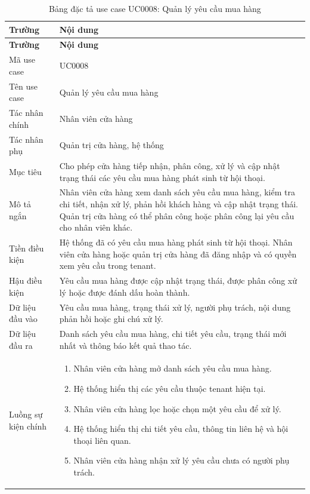 \documentclass[../DoAn.tex]{subfiles}
\begin{document}
\begin{longtable}{|p{}|p{}|}
\caption{Bảng đặc tả use case UC0008: Quản lý yêu cầu mua hàng}
\label{table:UC0008} \\
\hline
\textbf{Trường} & \textbf{Nội dung} \\
\hline
\endfirsthead

\hline
\textbf{Trường} & \textbf{Nội dung} \\
\hline
\endhead

Mã use case & UC0008 \\
\hline
Tên use case & Quản lý yêu cầu mua hàng \\
\hline
Tác nhân chính & Nhân viên cửa hàng \\
\hline
Tác nhân phụ & Quản trị cửa hàng, hệ thống \\
\hline
Mục tiêu & Cho phép cửa hàng tiếp nhận, phân công, xử lý và cập nhật trạng thái các yêu cầu mua hàng phát sinh từ hội thoại. \\
\hline
Mô tả ngắn & Nhân viên cửa hàng xem danh sách yêu cầu mua hàng, kiểm tra chi tiết, nhận xử lý, phản hồi khách hàng và cập nhật trạng thái. Quản trị cửa hàng có thể phân công hoặc phân công lại yêu cầu cho nhân viên khác. \\
\hline
Tiền điều kiện & Hệ thống đã có yêu cầu mua hàng phát sinh từ hội thoại. Nhân viên cửa hàng hoặc quản trị cửa hàng đã đăng nhập và có quyền xem yêu cầu trong tenant. \\
\hline
Hậu điều kiện & Yêu cầu mua hàng được cập nhật trạng thái, được phân công xử lý hoặc được đánh dấu hoàn thành. \\
\hline
Dữ liệu đầu vào & Yêu cầu mua hàng, trạng thái xử lý, người phụ trách, nội dung phản hồi hoặc ghi chú xử lý. \\
\hline
Dữ liệu đầu ra & Danh sách yêu cầu mua hàng, chi tiết yêu cầu, trạng thái mới nhất và thông báo kết quả thao tác. \\
\hline
Luồng sự kiện chính &
\begin{minipage}[t]{0.68\textwidth}
\begin{enumerate}
    \item Nhân viên cửa hàng mở danh sách yêu cầu mua hàng.
    \item Hệ thống hiển thị các yêu cầu thuộc tenant hiện tại.
    \item Nhân viên cửa hàng lọc hoặc chọn một yêu cầu để xử lý.
    \item Hệ thống hiển thị chi tiết yêu cầu, thông tin liên hệ và hội thoại liên quan.
    \item Nhân viên cửa hàng nhận xử lý yêu cầu chưa có người phụ trách.

\end{enumerate}
\end{minipage}
\end{longtable}
\end{document}
